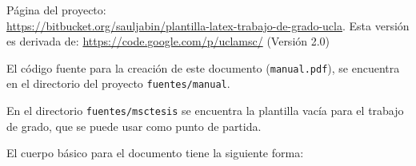 \introduccion


\noindent
Página del proyecto: \\ {\footnotesize \url{https://bitbucket.org/sauljabin/plantilla-latex-trabajo-de-grado-ucla}}. 
Esta versión es derivada de: \url{https://code.google.com/p/uclamsc/} (Versión 2.0)

El código fuente para la creación de este documento (\texttt{manual.pdf}), se encuentra en el directorio del proyecto \texttt{fuentes/manual}.

En el directorio \texttt{fuentes/msctesis} se encuentra la plantilla vacía para el trabajo de grado, que se puede usar como punto de partida.

El cuerpo básico para el documento tiene la siguiente forma:


